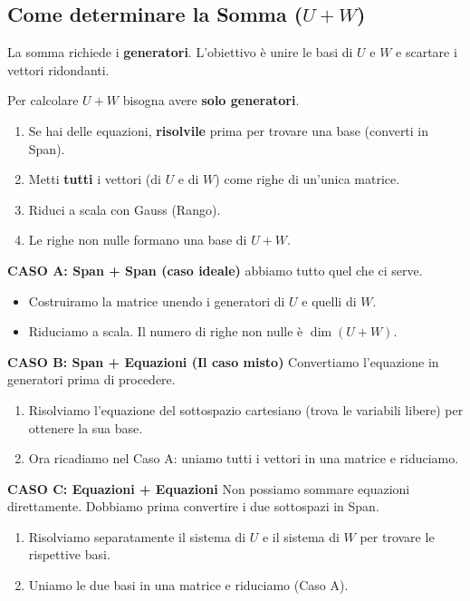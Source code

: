 \documentclass[10pt,a4paper]{article}
\begin{document}
\subsection*{Come determinare la Somma ($U+W$)}
La somma richiede i \textbf{generatori}. L'obiettivo è unire le basi di $U$ e $W$ e scartare i vettori ridondanti.

\begin{tcolorbox}[colback=green!5!white,colframe=green!50!black,title=\textbf{Procedimento}]
Per calcolare $U+W$ bisogna avere \textbf{solo generatori}.
\begin{enumerate}
    \item Se hai delle equazioni, \textbf{risolvile} prima per trovare una base (converti in Span).
    \item Metti \textbf{tutti} i vettori (di $U$ e di $W$) come righe di un'unica matrice.
    \item Riduci a scala con Gauss (Rango).
    \item Le righe non nulle formano una base di $U+W$.
\end{enumerate}
\end{tcolorbox}

\textbf{CASO A: Span + Span (caso ideale)}
abbiamo tutto quel che ci serve.
\begin{itemize}
    \item Costruiramo la matrice unendo i generatori di $U$ e quelli di $W$.
    \item Riduciamo a scala. Il numero di righe non nulle è $\dim(U+W)$.
\end{itemize}

\textbf{CASO B: Span + Equazioni (Il caso misto)}
Convertiamo l'equazione in generatori prima di procedere.
\begin{enumerate}
    \item Risolviamo l'equazione del sottospazio cartesiano (trova le variabili libere) per ottenere la sua base.
    \item Ora ricadiamo nel Caso A: uniamo tutti i vettori in una matrice e riduciamo.
\end{enumerate}

\textbf{CASO C: Equazioni + Equazioni}
Non possiamo sommare equazioni direttamente. Dobbiamo prima convertire i due sottospazi in Span.
\begin{enumerate}
    \item Risolviamo separatamente il sistema di $U$ e il sistema di $W$ per trovare le rispettive basi.
    \item Uniamo le due basi in una matrice e riduciamo (Caso A).
\end{enumerate}
\end{document}
